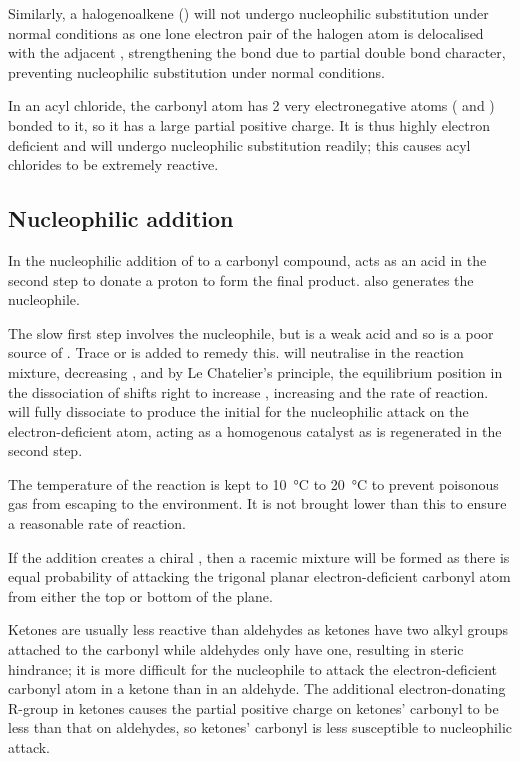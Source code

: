 \documentclass[Chemistry.tex]{subfiles}
\begin{document}
Similarly, a halogenoalkene () will not undergo nucleophilic substitution under normal conditions as one lone electron pair of the halogen atom is delocalised with the adjacent , strengthening the  bond due to partial double bond character, preventing nucleophilic substitution under normal conditions.

In an acyl chloride, the carbonyl  atom has 2 very electronegative atoms ( and ) bonded to it, so it has a large partial positive charge. It is thus highly electron deficient and will undergo nucleophilic substitution readily; this causes acyl chlorides to be extremely reactive.
\subsection{Nucleophilic addition}
In the nucleophilic addition of  to a carbonyl compound,  acts as an acid in the second step to donate a proton to form the final product.  also generates the  nucleophile.

The slow first step involves the  nucleophile, but  is a weak acid and so is a poor source of . Trace  or  is added to remedy this.  will neutralise  in the reaction mixture, decreasing , and by Le Chatelier's principle, the equilibrium position in the dissociation of  shifts right to increase , increasing  and the rate of reaction.  will fully dissociate to produce the initial  for the nucleophilic attack on the electron-deficient  atom, acting as a homogenous catalyst as  is regenerated in the second step.

The temperature of the reaction is kept to \SI{10}{\celsius} to \SI{20}{\celsius} to prevent poisonous  gas from escaping to the environment. It is not brought lower than this to ensure a reasonable rate of reaction.

If the addition creates a chiral , then a racemic mixture will be formed as there is equal probability of  attacking the trigonal planar electron-deficient carbonyl  atom from either the top or bottom of the plane.

Ketones are usually less reactive than aldehydes as ketones have two alkyl groups attached to the carbonyl  while aldehydes only have one, resulting in steric hindrance; it is more difficult for the nucleophile to attack the electron-deficient carbonyl  atom in a ketone than in an aldehyde. The additional electron-donating R-group in ketones causes the partial positive charge on ketones' carbonyl  to be less than that on aldehydes, so ketones' carbonyl  is less susceptible to nucleophilic attack.
\end{document}
